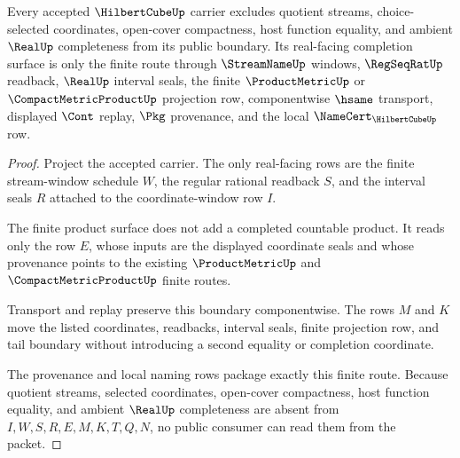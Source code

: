 \begin{theorem}
\label{thm:hilbert-cube-real-completion-boundary}
Every accepted $\HilbertCubeUp$ carrier excludes quotient streams, choice-selected coordinates, open-cover compactness, host function equality, and ambient $\RealUp$ completeness from its public boundary. Its real-facing completion surface is only the finite route through $\StreamNameUp$ windows, $\RegSeqRatUp$ readback, $\RealUp$ interval seals, the finite $\ProductMetricUp$ or $\CompactMetricProductUp$ projection row, componentwise $\hsame$ transport, displayed $\Cont$ replay, $\Pkg$ provenance, and the local $\NameCert_{\HilbertCubeUp}$ row.
\end{theorem}
\begin{proof}
Project the accepted carrier. The only real-facing rows are the finite stream-window schedule $W$, the regular rational readback $S$, and the interval seals $R$ attached to the coordinate-window row $I$.

The finite product surface does not add a completed countable product. It reads only the row $E$, whose inputs are the displayed coordinate seals and whose provenance points to the existing $\ProductMetricUp$ and $\CompactMetricProductUp$ finite routes.

Transport and replay preserve this boundary componentwise. The rows $M$ and $K$ move the listed coordinates, readbacks, interval seals, finite projection row, and tail boundary without introducing a second equality or completion coordinate.

The provenance and local naming rows package exactly this finite route. Because quotient streams, selected coordinates, open-cover compactness, host function equality, and ambient $\RealUp$ completeness are absent from $I,W,S,R,E,M,K,T,Q,N$, no public consumer can read them from the packet.
\end{proof}


